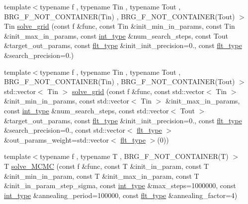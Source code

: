 \begin{DoxyCompactItemize}
\item 
{\footnotesize template$<$typename f , typename Tin , typename Tout , B\-R\-G\-\_\-\-F\-\_\-\-N\-O\-T\-\_\-\-C\-O\-N\-T\-A\-I\-N\-E\-R(\-Tin) , B\-R\-G\-\_\-\-F\-\_\-\-N\-O\-T\-\_\-\-C\-O\-N\-T\-A\-I\-N\-E\-R(\-Tout) $>$ }\\Tin \hyperlink{namespaceIceBRG_aa1178c976ba772b025aacf4b686cf17f}{solve\-\_\-grid} (const f \&func, const Tin \&init\-\_\-min\-\_\-in\-\_\-params, const Tin \&init\-\_\-max\-\_\-in\-\_\-params, const \hyperlink{lib_2IceBRG__main_2common_8h_ac4de9d9335536ac22821171deec8d39e}{int\-\_\-type} \&num\-\_\-search\-\_\-steps, const Tout \&target\-\_\-out\-\_\-params, const \hyperlink{lib_2IceBRG__main_2common_8h_ad0f130a56eeb944d9ef2692ee881ecc4}{flt\-\_\-type} \&init\-\_\-init\-\_\-precision=0., const \hyperlink{lib_2IceBRG__main_2common_8h_ad0f130a56eeb944d9ef2692ee881ecc4}{flt\-\_\-type} \&search\-\_\-precision=0.)
\item 
{\footnotesize template$<$typename f , typename Tin , typename Tout , B\-R\-G\-\_\-\-F\-\_\-\-N\-O\-T\-\_\-\-C\-O\-N\-T\-A\-I\-N\-E\-R(\-Tin) , B\-R\-G\-\_\-\-F\-\_\-\-N\-O\-T\-\_\-\-C\-O\-N\-T\-A\-I\-N\-E\-R(\-Tout) $>$ }\\std\-::vector$<$ Tin $>$ \hyperlink{namespaceIceBRG_a796f8239c7c8e5771b901fe380d24b96}{solve\-\_\-grid} (const f \&func, const std\-::vector$<$ Tin $>$ \&init\-\_\-min\-\_\-in\-\_\-params, const std\-::vector$<$ Tin $>$ \&init\-\_\-max\-\_\-in\-\_\-params, const \hyperlink{lib_2IceBRG__main_2common_8h_ac4de9d9335536ac22821171deec8d39e}{int\-\_\-type} \&num\-\_\-search\-\_\-steps, const std\-::vector$<$ Tout $>$ \&target\-\_\-out\-\_\-params, const \hyperlink{lib_2IceBRG__main_2common_8h_ad0f130a56eeb944d9ef2692ee881ecc4}{flt\-\_\-type} \&init\-\_\-init\-\_\-precision=0., const \hyperlink{lib_2IceBRG__main_2common_8h_ad0f130a56eeb944d9ef2692ee881ecc4}{flt\-\_\-type} \&search\-\_\-precision=0., const std\-::vector$<$ \hyperlink{lib_2IceBRG__main_2common_8h_ad0f130a56eeb944d9ef2692ee881ecc4}{flt\-\_\-type} $>$ \&out\-\_\-params\-\_\-weight=std\-::vector$<$ \hyperlink{lib_2IceBRG__main_2common_8h_ad0f130a56eeb944d9ef2692ee881ecc4}{flt\-\_\-type} $>$(0))
\item 
{\footnotesize template$<$typename f , typename T , B\-R\-G\-\_\-\-F\-\_\-\-N\-O\-T\-\_\-\-C\-O\-N\-T\-A\-I\-N\-E\-R(\-T) $>$ }\\T \hyperlink{namespaceIceBRG_aa51e1e175ccdd0ca0c583481f27cd903}{solve\-\_\-\-M\-C\-M\-C} (const f \&func, const T \&init\-\_\-in\-\_\-param, const T \&init\-\_\-min\-\_\-in\-\_\-param, const T \&init\-\_\-max\-\_\-in\-\_\-param, const T \&init\-\_\-in\-\_\-param\-\_\-step\-\_\-sigma, const \hyperlink{lib_2IceBRG__main_2common_8h_ac4de9d9335536ac22821171deec8d39e}{int\-\_\-type} \&max\-\_\-steps=1000000, const \hyperlink{lib_2IceBRG__main_2common_8h_ac4de9d9335536ac22821171deec8d39e}{int\-\_\-type} \&annealing\-\_\-period=100000, const \hyperlink{lib_2IceBRG__main_2common_8h_ad0f130a56eeb944d9ef2692ee881ecc4}{flt\-\_\-type} \&annealing\-\_\-factor=4)

\end{DoxyCompactItemize}
